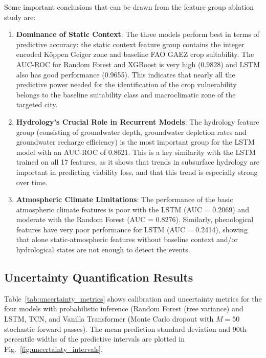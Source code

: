 \documentclass{ieeeaccess}
\begin{document}
Some important conclusions that can be drawn from the feature group ablation study are:
\begin{enumerate}
    \item \textbf{Dominance of Static Context}: The three models perform best in terms of predictive accuracy: the static context feature group contains the integer encoded Köppen Geiger zone and baseline FAO GAEZ crop suitability. The AUC-ROC for Random Forest and XGBoost is very high (0.9828) and LSTM also has good performance (0.9655). This indicates that nearly all the predictive power needed for the identification of the crop vulnerability belongs to the baseline suitability class and macroclimatic zone of the targeted city.
    \item \textbf{Hydrology's Crucial Role in Recurrent Models}: The hydrology feature group (consisting of groundwater depth, groundwater depletion rates and groundwater recharge efficiency) is the most important group for the LSTM model with an AUC-ROC of 0.8621. This is a key similarity with the LSTM trained on all 17 features, as it shows that trends in subsurface hydrology are important in predicting viability loss, and that this trend is especially strong over time.
    \item \textbf{Atmospheric Climate Limitations}: The performance of the basic atmospheric climate features is poor with the LSTM (AUC = 0.2069) and moderate with the Random Forest (AUC = 0.8276). Similarly, phenological features have very poor performance for LSTM (AUC = 0.2414), showing that alone static-atmospheric features without baseline context and/or hydrological states are not enough to detect the events.
\end{enumerate}

\subsection{Uncertainty Quantification Results}

Table~\ref{tab:uncertainty_metrics} shows calibration and uncertainty metrics for the four models with probabilistic inference (Random Forest (tree variance) and LSTM, TCN, and Vanilla Transformer (Monte Carlo dropout with $M = 50$ stochastic forward passes). The mean prediction standard deviation and 90th percentile widths of the predictive intervals are plotted in Fig.~\ref{fig:uncertainty_intervals}.
\end{document}
